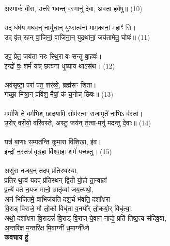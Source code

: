 अ॒स्माकं॑ वी॒रा, उत्त॑रे भवन्त् व॒स्मानु॑ देवा, अवता॒ हवे॑षु॥ (10)\\
\\
उद् ध॑र्षय मघव॒न् नायु॑धा॒न् युथ्सत्व॑नां माम॒कानां॒ महाꣳ॑ सि।\\
उद् वृ॑त् रहन् वा॒जिनां॒ वाजि॑ना॒न् युद्रथा॑नां॒ जय॑तामेतु॒ घोषः॑॥ (11)\\
\\
उप॒ प्रेत॒ जय॑ता नरः स्थि॒रा वः॑ सन्तु बा॒हवः॑।\\
इन्द्रो॑ वः॒ शर्म॑ यच् छत्वना धृ॒ष्याय थाऽस॑थ। (12)\\
\\
अव॑सृष्टा॒ परा॑ पत॒ शर॑व्ये॒, ब्रह्म॑सꣳ शिता।\\
गच्छा॒ मित्रा॒न् प्रवि॑श॒ मैषां॒ कं च॒नोच् छि॑षः॥ (13)\\
\\
मर्मा॑णि ते॒ वर्म॑भिश् छादयामि॒ सोम॑स्त्वा॒ राजा॒मृते॑ ना॒भिऽ व॑स्तां।\\
उ॒रोर् वरी॑यो॒ वरि॑वस्ते, अस्तु॒ जय॑न् तं॒त्वा-मनु॑ मदन्तु दे॒वाः॥ (14)\\
\\
यत्र॑ बा॒णाः स॒म्पत॑न्ति कुमा॒रा वि॑शि॒खा, इ॑व।\\
इन्द्रो॑ न॒स्तत्र॑ वृत्र॒हा वि॑श्वा॒हा शर्म॑ यच्छतु। (15)\\
\\
{\small असु॑रा नजय॒न् तदप् प्र॑तिरथस्या, \\
प्रतिर थ॒त्वं यदप् प्र॑तिरथन् द्वि॒ती यो॒हो ता॒न्वाहा᳚ \\
प्र॒त्ये॑ वते न॒यज॑ मानो॒ भ्रातृ॑व्यां जय॒त्यथो॒,\\
अन॑ भिजितमे॒ वाभिज॑यति दश॒र्चं भ॑वति॒ दशा᳚क्षरा \\
वि॒राड् विराजे॒ मौ लो॒कौ विधृ॑ता व॒नयो᳚र् लो॒कयो॒र् विधृ॑त्या॒,\\
अथो॒ दशा᳚क्षरा वि॒राडन्नं॑ वि॒राड् वि॒राज् ये॒वान् नाद्ये॒ प्रति॑ तिष्ठ॒त्य स॑दिव॒वा,\\
अ॒न्तरि॑क्ष म॒न्तरि॑क्ष मि॒वाग्नी᳚ ध्र॒माग्नी᳚ध्ने }\\
\textbf{कवचाय हुं} \\
\\
